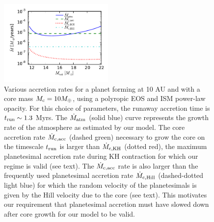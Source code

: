 \documentclass[apj]{emulateapj}
\newcommand{\co}{_{\rm c}}
\begin{document}
 \begin{figure}[h]
\centering
\includegraphics[width=0.5\textwidth]{../../figs/ModelAtmospheres/RadSelfGravRealEOS/PaperFigs/acc_rates_paper.pdf}
\caption{Various accretion rates for a planet forming at 10 AU and with a core mass $M\co=10 M_{\oplus}$, using a polyropic EOS and ISM power-law opacity. For this choice of parameters, the runaway accretion time is $t_{\rm run} \sim 1.3$ Myrs. The $\dot{M}_{\rm{atm}}$ (solid blue) curve represents the growth rate of the atmosphere as estimated by our model. The core accretion rate $\dot{M}_{\rm c, acc}$ (dashed green) necessary to grow the core on the timescale $t_{\rm run}$ is larger than $\dot{M}_{\rm c, KH}$ (dotted red), the maximum planetesimal accretion rate during KH contraction for which our regime is valid (see text). The $\dot{M}_{\rm c, acc}$ rate is also larger than the frequently used planetesimal accretion rate $\dot{M}_{\rm c, Hill}$ (dashed-dotted light blue) for which the random velocity of the planetesimals is given by the Hill velocity due to the core (see text). 
This motivates our requirement  that planetesimal accretion must have slowed down after core growth for our model to be valid.}

\label{fig:accrates}
\end{figure}
\end{document}
